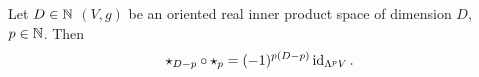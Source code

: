 \begin{proposition}
  Let
    $D \in \mathbb{N}$
    $(V, g)$ be an oriented real inner product space of dimension $D$,
    $p \in \mathbb{N}$.
  Then
  \begin{equation}
    \star_{D - p} \circ \star_p = (-1)^{p (D - p)} \mathop{\rm id}\nolimits_{\Lambda^p V}.
  \end{equation}
\end{proposition}
